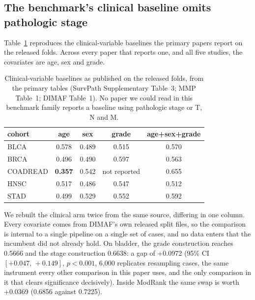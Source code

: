 \documentclass[11pt]{article}
\begin{document}
\subsection{The benchmark's clinical baseline omits pathologic stage}

Table~\ref{tab:published-clinical} reproduces the clinical-variable baselines the primary papers
report on the released folds. Across every paper that reports one, and all five studies, the
covariates are age, sex and grade.

\begin{table}[t]
\centering
\caption{Clinical-variable baselines as published on the released folds, from the primary tables
(SurvPath Supplementary Table~3; MMP Table~1; DIMAF Table~1). No paper we could read in this
benchmark family reports a baseline using pathologic stage or T, N and M.}
\label{tab:published-clinical}
\begin{tabular}{lcccc}
\toprule
cohort & age & sex & grade & age+sex+grade \\
\midrule
BLCA     & 0.578 & 0.489 & 0.515 & 0.570 \\
BRCA     & 0.496 & 0.490 & 0.597 & 0.563 \\
COADREAD & \textbf{0.357} & 0.542 & not reported & 0.655 \\
HNSC     & 0.517 & 0.486 & 0.547 & 0.512 \\
STAD     & 0.499 & 0.529 & 0.552 & 0.592 \\
\bottomrule
\end{tabular}
\end{table}


We rebuilt the clinical arm twice from the same source, differing in one column. Every covariate
comes from DIMAF's own released split files, so the comparison is
internal to a single pipeline on a single set of cases, and no data enters that the incumbent did
not already hold. On bladder, the grade construction reaches 0.5666 and the stage construction
0.6638: a gap of +0.0972 (95\% CI $[+0.047,\,+0.149]$, $p<0.001$, 6{,}000 replicates
resampling cases, the same instrument every other comparison in this paper uses, and the only
comparison in it that clears significance decisively). Inside ModRank the same swap is worth +0.0369
(0.6856 against 0.7225).
\end{document}

